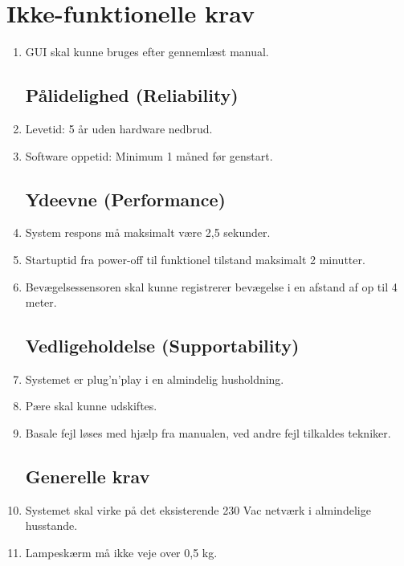 \section{Ikke-funktionelle krav}

\begin{enumerate}
	\subsection*{Brugbarhed (Usability)}
	    \item GUI skal kunne bruges efter gennemlæst manual.
	
	\subsection*{Pålidelighed (Reliability)}
	    \item Levetid: 5 år uden hardware nedbrud.
	    \item Software oppetid: Minimum 1 måned før genstart.
	
	\subsection*{Ydeevne (Performance)}
	    \item System respons må maksimalt være 2,5 sekunder.
	    \item Startuptid fra power-off til funktionel tilstand maksimalt 2 minutter.
	    \item Bevægelsessensoren skal kunne registrerer bevægelse i en afstand af op til 4 meter.

	\subsection*{Vedligeholdelse (Supportability)}
    	\item Systemet er plug’n’play i en almindelig husholdning.
	    \item Pære skal kunne udskiftes.
	    \item Basale fejl løses med hjælp fra manualen, ved andre fejl tilkaldes tekniker.

    \subsection*{Generelle krav}
	    \item Systemet skal virke på det eksisterende 230 Vac netværk i almindelige husstande.
	    \item Lampeskærm må ikke veje over 0,5 kg.
\end{enumerate}